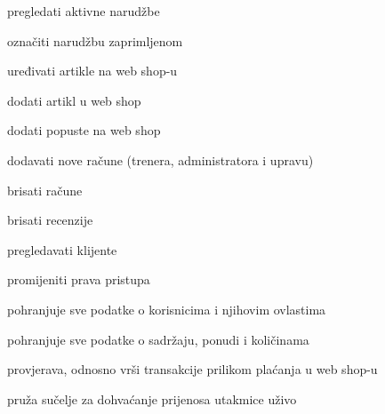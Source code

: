 \begin{packed_enum}
		\begin{packed_enum}
			
			\item pregledati aktivne narudžbe
			\item označiti narudžbu zaprimljenom
			\item uređivati artikle na web shop-u
			\item dodati artikl u web shop
			\item dodati popuste na web shop
			
		\end{packed_enum}
	
	\item  {}
	
	\begin{packed_enum}
		
		\item dodavati nove račune (trenera, administratora i upravu)
		\item brisati račune
		\item brisati recenzije
		\item pregledavati klijente
		\item promijeniti prava pristupa
	
	\end{packed_enum}
\item  {}

\begin{packed_enum}
	
	\item pohranjuje sve podatke o korisnicima i njihovim ovlastima
	\item pohranjuje sve podatke o sadržaju, ponudi i količinama

	
\end{packed_enum}
		\item  {}
		
		\begin{packed_enum}
			
			\item provjerava, odnosno vrši transakcije prilikom plaćanja u web shop-u
			
			
		\end{packed_enum}
	
		\item  {}
		
		\begin{packed_enum}
			\item pruža sučelje za dohvaćanje prijenosa utakmice uživo
		\end{packed_enum}
		
			\end{packed_enum}
			
